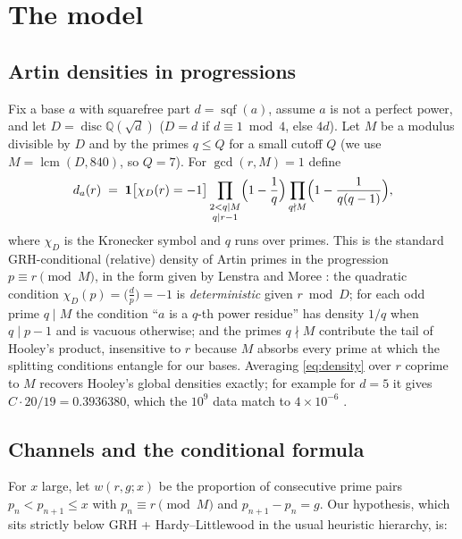 \documentclass[11pt,reqno]{amsart}
\theoremstyle{plain}
\theoremstyle{definition}
\DeclareMathOperator{\sqf}{sqf}
\newcommand{\Q}{\mathbb{Q}}
\newcommand{\dA}{d_a}
\begin{document}
\section{The model}

\subsection{Artin densities in progressions}

Fix a base $a$ with squarefree part $d = \sqf(a)$, assume $a$ is not a
perfect power, and let $D = \operatorname{disc} \Q(\sqrt{d})$ ($D = d$ if
$d \equiv 1 \bmod 4$, else $4d$). Let $M$ be a modulus divisible by $D$ and
by the primes $q \le Q$ for a small cutoff $Q$ (we use
$M = \operatorname{lcm}(D, 840)$, so $Q = 7$). For $\gcd(r, M) = 1$ define
\begin{equation}\label{eq:density}
\dA(r) \;=\;
\mathbf{1}\bigl[\chi_D(r) = -1\bigr]
\prod_{\substack{2 < q \mid M \\ q \mid r - 1}}
\Bigl(1 - \frac{1}{q}\Bigr)
\prod_{q \nmid M} \Bigl(1 - \frac{1}{q(q-1)}\Bigr),
\end{equation}
where $\chi_D$ is the Kronecker symbol and $q$ runs over primes. This is the
standard GRH-conditional (relative) density of Artin primes in the
progression $p \equiv r \pmod{M}$, in the form given by Lenstra
\cite{Lenstra1977} and Moree \cite{Moree2012}: the quadratic condition
$\chi_D(p) = \bigl(\tfrac{d}{p}\bigr) = -1$ is \emph{deterministic} given
$r \bmod D$; for each odd prime $q \mid M$ the condition ``$a$ is a $q$-th
power residue'' has density $1/q$ when $q \mid p - 1$ and is vacuous
otherwise; and the primes $q \nmid M$ contribute the tail of Hooley's
product, insensitive to $r$ because $M$ absorbs every prime at which the
splitting conditions entangle for our bases. Averaging \eqref{eq:density}
over $r$ coprime to $M$ recovers Hooley's global densities exactly; for
example for $d = 5$ it gives $C \cdot 20/19 = 0.3936380$, which the $10^9$
data match to $4 \times 10^{-6}$ \cite{BaldIII}.

\subsection{Channels and the conditional formula}

For $x$ large, let $w(r, g; x)$ be the proportion of consecutive prime pairs
$p_n < p_{n+1} \le x$ with $p_n \equiv r \pmod{M}$ and $p_{n+1} - p_n = g$.
Our hypothesis, which sits strictly below GRH + Hardy--Littlewood in the
usual heuristic hierarchy, is:
\end{document}
